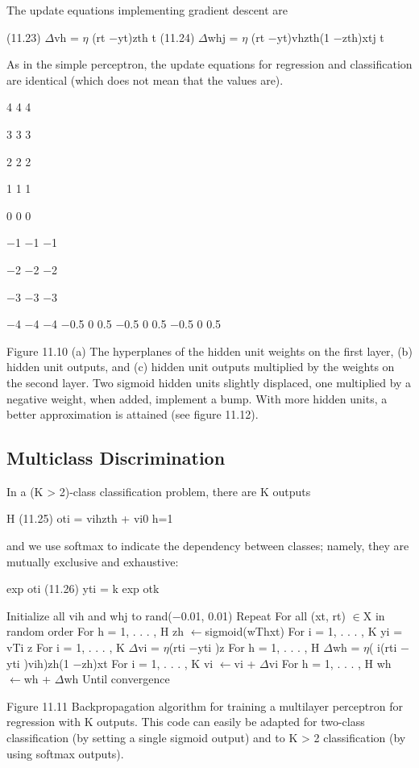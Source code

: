 The update equations implementing gradient descent are

(11.23) $\Delta$vh = $\eta$ (rt $-$yt)zth t (11.24) $\Delta$whj = $\eta$ (rt $-$yt)vhzth(1 $-$zth)xtj t

As in the simple perceptron, the update equations for regression and classification are identical (which does not mean that the values are).

4 4 4

3 3 3

2 2 2

1 1 1

0 0 0

$-$1 $-$1 $-$1

$-$2 $-$2 $-$2

$-$3 $-$3 $-$3

$-$4 $-$4 $-$4 $-$0.5 0 0.5 $-$0.5 0 0.5 $-$0.5 0 0.5

Figure 11.10 (a) The hyperplanes of the hidden unit weights on the first layer, (b) hidden unit outputs, and (c) hidden unit outputs multiplied by the weights on the second layer. Two sigmoid hidden units slightly displaced, one multiplied by a negative weight, when added, implement a bump. With more hidden units, a better approximation is attained (see figure 11.12).

\subsection{Multiclass Discrimination}

In a (K > 2)-class classification problem, there are K outputs

H (11.25) oti = vihzth + vi0 h=1

and we use softmax to indicate the dependency between classes; namely, they are mutually exclusive and exhaustive:

exp oti (11.26) yti = k exp otk

Initialize all vih and whj to rand($-$0.01, 0.01) Repeat For all (xt, rt) $\in$X in random order For h = 1, . . . , H zh $\leftarrow$sigmoid(wThxt) For i = 1, . . . , K yi = vTi z For i = 1, . . . , K $\Delta$vi = $\eta$(rti $-$yti )z For h = 1, . . . , H $\Delta$wh = $\eta$( i(rti $-$yti )vih)zh(1 $-$zh)xt For i = 1, . . . , K vi $\leftarrow$vi + $\Delta$vi For h = 1, . . . , H wh $\leftarrow$wh + $\Delta$wh Until convergence

Figure 11.11 Backpropagation algorithm for training a multilayer perceptron for regression with K outputs. This code can easily be adapted for two-class classification (by setting a single sigmoid output) and to K > 2 classification (by using softmax outputs).

